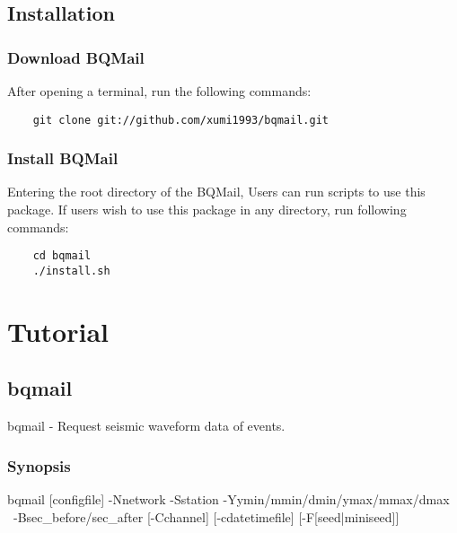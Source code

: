 \documentclass[12pt, a4paper]{report}
\begin{document}
\section{Installation}
\subsection{Download BQMail}
After opening a terminal, run the following commands:
\begin{lstlisting}
	git clone git://github.com/xumi1993/bqmail.git
\end{lstlisting}
\subsection{Install BQMail}
Entering the root directory of the BQMail, Users can run scripts to use this package. If users wish to use this package in any  directory, run following commands:
\begin{lstlisting}
	cd bqmail
	./install.sh
\end{lstlisting}

\chapter{Tutorial}
\section{bqmail}
bqmail - Request seismic waveform data of events.
\subsection{Synopsis}
{\tb bqmail} [{\ti configfile}] {\tb -N}{\ti network} {\tb -S}{\ti station} {\tb -Y}{\ti ymin/mmin/dmin/ymax/mmax/dmax}\\\
 {\tb -B}{\ti sec\_before/sec\_after} [{\tb -C}{\ti channel}] [{\tb -c}{\ti datetimefile}] [{\tb -F[{\ti seed}|{\ti miniseed}]}]
\end{document}
